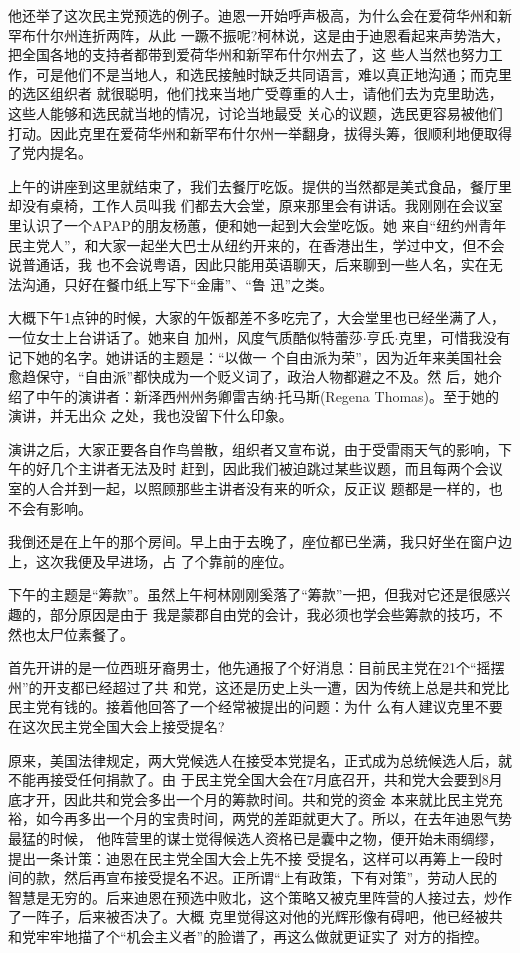﻿\documentclass[11pt]{article}
\begin{document}
他还举了这次民主党预选的例子。迪恩一开始呼声极高，为什么会在爱荷华州和新罕布什尔州连折两阵，从此
一蹶不振呢?柯林说，这是由于迪恩看起来声势浩大，把全国各地的支持者都带到爱荷华州和新罕布什尔州去了，这
些人当然也努力工作，可是他们不是当地人，和选民接触时缺乏共同语言，难以真正地沟通；而克里的选区组织者
就很聪明，他们找来当地广受尊重的人士，请他们去为克里助选，这些人能够和选民就当地的情况，讨论当地最受
关心的议题，选民更容易被他们打动。因此克里在爱荷华州和新罕布什尔州一举翻身，拔得头筹，很顺利地便取得
了党内提名。

上午的讲座到这里就结束了，我们去餐厅吃饭。提供的当然都是美式食品，餐厅里却没有桌椅，工作人员叫我
们都去大会堂，原来那里会有讲话。我刚刚在会议室里认识了一个APAP的朋友杨蕙，便和她一起到大会堂吃饭。她
来自``纽约州青年民主党人''，和大家一起坐大巴士从纽约开来的，在香港出生，学过中文，但不会说普通话，我
也不会说粤语，因此只能用英语聊天，后来聊到一些人名，实在无法沟通，只好在餐巾纸上写下``金庸''、``鲁
迅''之类。

大概下午1点钟的时候，大家的午饭都差不多吃完了，大会堂里也已经坐满了人，一位女士上台讲话了。她来自
加州，风度气质酷似特蕾莎$\cdot$亨氏$\cdot$克里，可惜我没有记下她的名字。她讲话的主题是：``以做一
个自由派为荣''，因为近年来美国社会愈趋保守，``自由派''都快成为一个贬义词了，政治人物都避之不及。然
后，她介绍了中午的演讲者：新泽西州州务卿雷吉纳$\cdot$托马斯(Regena Thomas)。至于她的演讲，并无出众
之处，我也没留下什么印象。

演讲之后，大家正要各自作鸟兽散，组织者又宣布说，由于受雷雨天气的影响，下午的好几个主讲者无法及时
赶到，因此我们被迫跳过某些议题，而且每两个会议室的人合并到一起，以照顾那些主讲者没有来的听众，反正议
题都是一样的，也不会有影响。

我倒还是在上午的那个房间。早上由于去晚了，座位都已坐满，我只好坐在窗户边上，这次我便及早进场，占
了个靠前的座位。

下午的主题是``筹款''。虽然上午柯林刚刚奚落了``筹款''一把，但我对它还是很感兴趣的，部分原因是由于
我是蒙郡自由党的会计，我必须也学会些筹款的技巧，不然也太尸位素餐了。

首先开讲的是一位西班牙裔男士，他先通报了个好消息：目前民主党在21个``摇摆州''的开支都已经超过了共
和党，这还是历史上头一遭，因为传统上总是共和党比民主党有钱的。接着他回答了一个经常被提出的问题：为什
么有人建议克里不要在这次民主党全国大会上接受提名?

原来，美国法律规定，两大党候选人在接受本党提名，正式成为总统候选人后，就不能再接受任何捐款了。由
于民主党全国大会在7月底召开，共和党大会要到8月底才开，因此共和党会多出一个月的筹款时间。共和党的资金
本来就比民主党充裕，如今再多出一个月的宝贵时间，两党的差距就更大了。所以，在去年迪恩气势最猛的时候，
他阵营里的谋士觉得候选人资格已是囊中之物，便开始未雨绸缪，提出一条计策：迪恩在民主党全国大会上先不接
受提名，这样可以再筹上一段时间的款，然后再宣布接受提名不迟。正所谓``上有政策，下有对策''，劳动人民的
智慧是无穷的。后来迪恩在预选中败北，这个策略又被克里阵营的人接过去，炒作了一阵子，后来被否决了。大概
克里觉得这对他的光辉形像有碍吧，他已经被共和党牢牢地描了个``机会主义者''的脸谱了，再这么做就更证实了
对方的指控。
\end{document}
